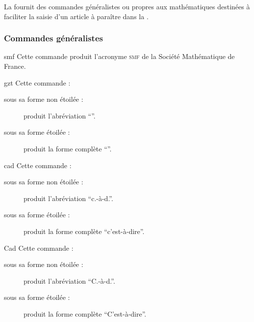La \gztauthorcl{} fournit des commandes généralistes ou propres aux
mathématiques destinées à faciliter la saisie d'un article à paraître dans la
\gzt{}.

\subsubsection{Commandes généralistes}
\label{sec-comm-gener}

\begin{docCommand}{smf}{}
  Cette commande produit l'acronyme \textsc{smf} de la Société Mathématique de
  France.
\end{docCommand}

\begin{docCommand}{gzt}{}
  Cette commande :
  \begin{description}
  \item[sous sa forme non étoilée :] produit l'abréviation \enquote{\gzt}.
  \item[sous sa forme étoilée :] produit la forme complète \enquote{\gzt*}.
  \end{description}
\end{docCommand}

\begin{docCommand}{cad}{}
  Cette commande :
  \begin{description}
  \item[sous sa forme non étoilée :] produit l'abréviation \enquote{c.-à-d.}.
  \item[sous sa forme étoilée :] produit la forme complète
    \enquote{c'est-à-dire}.
  \end{description}
\end{docCommand}

\begin{docCommand}{Cad}{}
  Cette commande :
  \begin{description}
  \item[sous sa forme non étoilée :] produit l'abréviation \enquote{C.-à-d.}.
  \item[sous sa forme étoilée :] produit la forme complète
    \enquote{C'est-à-dire}.
  \end{description}
\end{docCommand}

